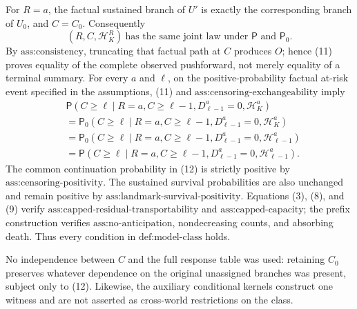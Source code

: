 For \(R=a\), the factual sustained branch of \(U'\) is exactly the corresponding branch of \(U_0\), and \(C=C_0\). Consequently
\[
 (R,C,\mathcal H_K^R)\ \text{has the same joint law under }
 \mathsf P\text{ and }\mathsf P_0.                       \tag{11}
\]
By \(\text{ass:consistency}\), truncating that factual path at \(C\) produces \(O\); hence (11) proves equality of the complete observed pushforward, not merely equality of a terminal summary. For every \(a\) and \(\ell\), on the positive-probability factual at-risk event specified in the assumptions, (11) and \(\text{ass:censoring-exchangeability}\) imply
\[
 \begin{aligned}
 &\mathsf P(C\ge\ell\mid R=a,C\ge\ell-1,D_{\ell-1}^a=0,
                         \mathcal H_K^a)\\
 &=\mathsf P_0(C\ge\ell\mid R=a,C\ge\ell-1,D_{\ell-1}^a=0,
                           \mathcal H_K^a)\\
 &=\mathsf P_0(C\ge\ell\mid R=a,C\ge\ell-1,D_{\ell-1}^a=0,
                           \mathcal H_{\ell-1}^a)\\
 &=\mathsf P(C\ge\ell\mid R=a,C\ge\ell-1,D_{\ell-1}^a=0,
                         \mathcal H_{\ell-1}^a).
 \end{aligned}                                           \tag{12}
\]
The common continuation probability in (12) is strictly positive by \(\text{ass:censoring-positivity}\). The sustained survival probabilities are also unchanged and remain positive by \(\text{ass:landmark-survival-positivity}\). Equations (3), (8), and (9) verify \(\text{ass:capped-residual-transportability}\) and \(\text{ass:capped-capacity}\); the prefix construction verifies \(\text{ass:no-anticipation}\), nondecreasing counts, and absorbing death. Thus every condition in \(\text{def:model-class}\) holds.

No independence between \(C\) and the full response table was used: retaining \(C_0\) preserves whatever dependence on the original unassigned branches was present, subject only to (12). Likewise, the auxiliary conditional kernels construct one witness and are not asserted as cross-world restrictions on the class.


